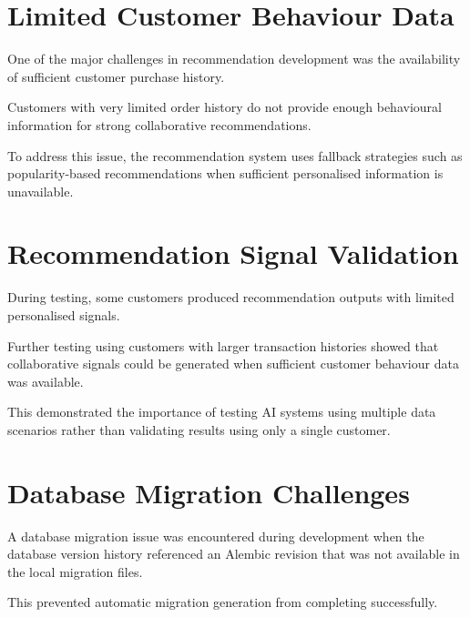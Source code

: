 \documentclass[12pt,a4paper]{report}
\begin{document}

\section{Limited Customer Behaviour Data}

One of the major challenges in recommendation development was the
availability of sufficient customer purchase history.

Customers with very limited order history do not provide enough
behavioural information for strong collaborative recommendations.

To address this issue, the recommendation system uses fallback
strategies such as popularity-based recommendations when sufficient
personalised information is unavailable.



\section{Recommendation Signal Validation}

During testing, some customers produced recommendation outputs with
limited personalised signals.

Further testing using customers with larger transaction histories showed
that collaborative signals could be generated when sufficient customer
behaviour data was available.

This demonstrated the importance of testing AI systems using multiple
data scenarios rather than validating results using only a single
customer.



\section{Database Migration Challenges}

A database migration issue was encountered during development when the
database version history referenced an Alembic revision that was not
available in the local migration files.

This prevented automatic migration generation from completing
successfully.
\end{document}
